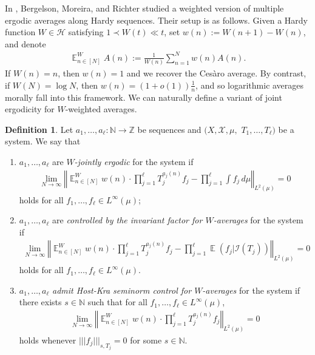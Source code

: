 \documentclass[11pt]{amsart}
\theoremstyle{definition}
\newtheorem{definition}[lemma]{Definition}
\DeclareMathOperator*{\E}{\mathbb{E}}
\newcommand{\N}{{\mathbb N}}
\newcommand{\Z}{{\mathbb Z}}
\newcommand{\CH}{{\mathcal H}}
\newcommand{\CI}{{\mathcal I}}
\newcommand{\CX}{{\mathcal X}}
\newcommand{\norm}[1]{\left\Vert #1\right\Vert}
\newcommand{\nnorm}[1]{\lvert\!|\!| #1|\!|\!\rvert}
\newcommand{\1}{{\mathbf{1}}}
\begin{document}
    In \cite{BMR20}, Bergelson, Moreira, and Richter studied a weighted version of multiple ergodic averages along Hardy sequences. Their setup is as follows.
    Given a Hardy function $W\in\CH$ satisfying $1\prec W(t)\ll t$, set $w(n) := W(n+1)-W(n)$, and denote
    \begin{align*}
        \E_{n\in[N]}^W A(n) := \frac{1}{W(n)}\sum_{n=1}^N w(n) A(n). 
    \end{align*}
    If $W(n) = n$, then $w(n) = 1$ and we recover the Ces\`aro average. By contrast, if $W(N) = \log N$, then $w(n)=(1+o(1))\frac{1}{n}$, and so logarithmic averages morally fall into this framework. We can naturally define a variant of joint ergodicity for $W$-weighted averages.
    \begin{definition}
        Let $a_1, \ldots, a_\ell:\N\to\Z$ be sequences and $(X, \CX, \mu,$\! $T_1, \ldots, T_\ell)$ be a system. We say that
        \begin{enumerate}
            \item $a_1, \ldots, a_\ell$ are \emph{$W$-jointly ergodic} for the system  if 
        \begin{align}\label{E: W-joint ergodicity}
        \lim_{N\to\infty}\norm{\E^W_{n\in[N]}w(n)\cdot \prod_{j=1}^\ell T_j^{{a_{j}(n)}}f_j - \prod_{j=1}^\ell \int f_j\, d\mu}_{L^2(\mu)} = 0
    \end{align}
    holds for all $f_1, \ldots, f_\ell\in L^\infty(\mu)$;
    \item $a_1, \ldots, a_\ell$ are \emph{controlled by the invariant factor for $W$-averages} for the system  if 
        \begin{align*}%
        \lim_{N\to\infty}\norm{\E^W_{n\in[N]}w(n)\cdot \prod_{j=1}^\ell T_j^{{a_{j}(n)}}f_j - \prod_{j=1}^\ell \E(f_j|\CI(T_j))}_{L^2(\mu)} = 0
    \end{align*}
    holds for all $f_1, \ldots, f_\ell\in L^\infty(\mu)$.
    \item $a_1, \ldots, a_\ell$ \emph{admit Host-Kra seminorm control for $W$-averages} for the system  if there exists $s\in\N$ such that for all $f_1, \ldots, f_\ell\in L^\infty(\mu)$,
        \begin{align*}%
        \lim_{N\to\infty}\norm{\E^W_{n\in[N]}w(n)\cdot \prod_{j=1}^\ell T_j^{{a_{j}(n)}}f_j}_{L^2(\mu)} = 0
    \end{align*}
    holds whenever $\nnorm{f_j}_{s,T_j} = 0$ for some $s\in\N$.
        \end{enumerate}
    \end{definition}
\end{document}
